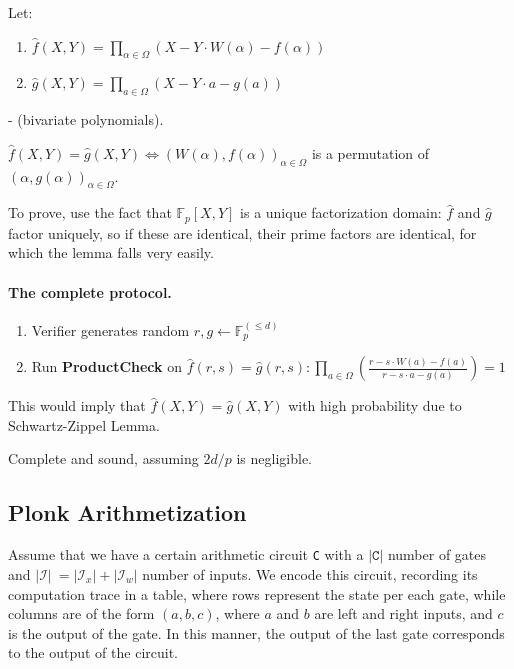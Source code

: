 \documentclass[../lecture-notes.tex]{subfiles}
\begin{document}
\begin{lemma}
Let:
    \begin{enumerate}
        \item \(\hat{f}(X,Y) = \prod_{\alpha \in \Omega} (X - Y \cdot W(\alpha) - f(\alpha))\)
        \item \(\hat{g}(X,Y) = \prod_{a \in \Omega} (X - Y \cdot a - g(a))\)
    \end{enumerate}
- (bivariate polynomials).  

\(\hat{f}(X,Y) = \hat{g}(X,Y) \iff \left( W(\alpha), f(\alpha) \right)_{\alpha \in \Omega}\) is a permutation of \(\left( \alpha, g(\alpha) \right)_{\alpha \in \Omega}\).

To prove, use the fact that \(\mathbb{F}_p[X,Y]\) is a unique factorization domain: \(\hat{f}\) and \(\hat{g}\) factor uniquely, so if these are identical, their prime factors are identical, for which the lemma falls very easily.
\end{lemma}

\paragraph{The complete protocol.}
\begin{enumerate}
    \item Verifier generates random \(r, g \leftarrow\mathbb{F}_p^{(\leq d)} \)
    \item Run \textbf{ProductCheck} on \(\hat{f}(r, s) = \hat{g}(r, s): \prod_{a \in \Omega} \left( \frac{r - s \cdot W(a) - f(a)}{r - s \cdot a - g(a)} \right) = 1\)
\end{enumerate}

This would imply that \(\hat{f}(X,Y) = \hat{g}(X,Y)\) with high probability due to Schwartz-Zippel Lemma.

\begin{remark}
Complete and sound, assuming \(2d/p\) is negligible.
\end{remark}

\subsection{Plonk Arithmetization}

Assume that we have a certain arithmetic circuit \texttt{C} with a \(|\texttt{C}|\) number of gates and \(|\mathcal{I}|\ = |\mathcal{I}_x| + |\mathcal{I}_w|\) number of inputs. We encode this circuit, recording its computation trace in a table, where rows represent the state per each gate, while columns are of the form \((a, b, c)\), where \(a\) and \(b\) are left and right inputs, and \(c\) is the output of the gate. In this manner, the output of the last gate corresponds to the output of the circuit.
\end{document}
